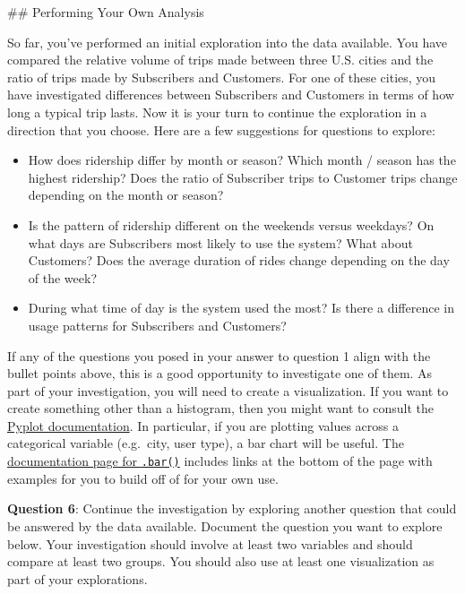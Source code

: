 \documentclass[11pt]{article}
\providecommand{\tightlist}{%
      \setlength{\itemsep}{0pt}\setlength{\parskip}{0pt}}
\begin{document}
     \#\# Performing Your Own Analysis

So far, you've performed an initial exploration into the data available.
You have compared the relative volume of trips made between three U.S.
cities and the ratio of trips made by Subscribers and Customers. For one
of these cities, you have investigated differences between Subscribers
and Customers in terms of how long a typical trip lasts. Now it is your
turn to continue the exploration in a direction that you choose. Here
are a few suggestions for questions to explore:

\begin{itemize}
\tightlist
\item
  How does ridership differ by month or season? Which month / season has
  the highest ridership? Does the ratio of Subscriber trips to Customer
  trips change depending on the month or season?
\item
  Is the pattern of ridership different on the weekends versus weekdays?
  On what days are Subscribers most likely to use the system? What about
  Customers? Does the average duration of rides change depending on the
  day of the week?
\item
  During what time of day is the system used the most? Is there a
  difference in usage patterns for Subscribers and Customers?
\end{itemize}

If any of the questions you posed in your answer to question 1 align
with the bullet points above, this is a good opportunity to investigate
one of them. As part of your investigation, you will need to create a
visualization. If you want to create something other than a histogram,
then you might want to consult the
\href{https://matplotlib.org/devdocs/api/pyplot_summary.html}{Pyplot
documentation}. In particular, if you are plotting values across a
categorical variable (e.g.~city, user type), a bar chart will be useful.
The
\href{https://matplotlib.org/devdocs/api/_as_gen/matplotlib.pyplot.bar.html\#matplotlib.pyplot.bar}{documentation
page for \texttt{.bar()}} includes links at the bottom of the page with
examples for you to build off of for your own use.

\textbf{Question 6}: Continue the investigation by exploring another
question that could be answered by the data available. Document the
question you want to explore below. Your investigation should involve at
least two variables and should compare at least two groups. You should
also use at least one visualization as part of your explorations.
\end{document}
